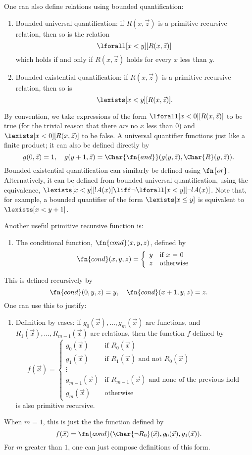 \documentclass[../../include/open-logic-section]{subfiles}
\begin{document}
One can also define relations using bounded quantification:
\begin{enumerate}
\item Bounded universal quantification: if $R(x, \vec z)$ is a
primitive recursive relation, then so is the relation 
\[
\lforall[x < y][R(x, \vec z)]
\]
which holds if and only if $R(x,\vec z)$ holds for every $x$ less than
$y$.
\item Bounded existential quantification: if $R(x, \vec z)$ is a
primitive recursive relation, then so is 
\[
\lexists[x < y][R(x, \vec z)].
\]
\end{enumerate}
By convention, we take expressions of the form $\lforall[x < 0][R(x,\vec
z)]$ to be true (for the trivial reason that there \emph{are} no $x$
less than $0$) and $\lexists[x < 0][R(x,\vec z)]$ to be false. A universal
quantifier functions just like a finite product; it can also be
defined directly by
\[
g(0,\vec z) = 1, \quad g(y+1,\vec z) = \Char{\fn{and}}(g(y,\vec
z),\Char{R}(y,\vec z)).
\]
Bounded existential quantification can similarly be defined using
$\fn{or}$. Alternatively, it can be defined from bounded universal
quantification, using the equivalence, $\lexists[x < y][!A(x)] \liff \lnot
\lforall[x < y][\lnot !A(x)]$. Note that, for example, a bounded quantifier
of the form $\lexists[x \leq y]$ is equivalent to $\lexists[x < y+1]$.

Another useful primitive recursive function is:
\begin{enumerate}
\item The conditional function, $\fn{cond}(x,y,z)$, defined by
\[
\fn{cond}(x,y,z) = \left\{ \begin{array}{ll}
  y & \mbox{if $x$ = 0} \\
  z & \mbox{otherwise}
\end{array}\right.
\]
\end{enumerate}
This is defined recursively by
\[
\fn{cond}(0,y,z) = y, \quad \fn{cond}(x+1,y,z) = z.
\]
One can use this to justify:
\begin{enumerate}
\item Definition by cases: if $g_0(\vec x), \dots, g_m(\vec x)$ are
functions, and $R_1(\vec x), \dots, R_{m-1}(\vec x)$ are relations, then
the function $f$ defined by
\[
f(\vec x) = \left\{\begin{array}{ll}
    g_0(\vec x) & \mbox{if $R_0(\vec{x})$} \\
    g_1(\vec x) & \mbox{if $R_1(\vec{x})$ and not $R_0(\vec{x})$} \\
    \vdots & \\
    g_{m-1}(\vec x) & \mbox{if $R_{m-1}(\vec{x})$ and none of the
      previous hold}
    \\
    g_m(\vec x) & \mbox{otherwise}
\end{array}\right.
\]
is also primitive recursive.
\end{enumerate}
When $m = 1$, this is just the the function defined by 
\[
f(\vec x) = \fn{cond}(\Char{\lnot R_0}(\vec x),g_0(\vec x),g_1(\vec
 x)).
\]
For $m$ greater than $1$, one can just compose definitions of this
form. 
\end{document}
